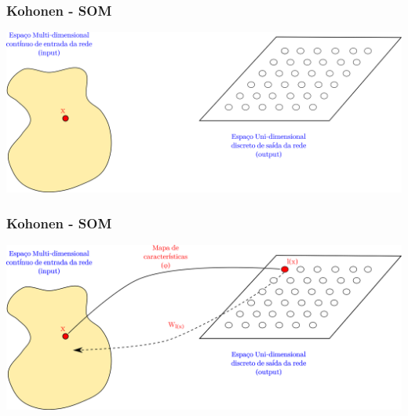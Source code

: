\documentclass[aspectratio=10]{beamer} %
\begin{document}
\begin{frame}
 \frametitle{Kohonen - SOM}
 \includegraphics[scale=0.5]{Imagens/IntroKoho3.png} 
\end{frame}

\begin{frame}
 \frametitle{Kohonen - SOM}
 \includegraphics[scale=0.5]{Imagens/IntroKoho4.png} 
\end{frame}
\end{document}
